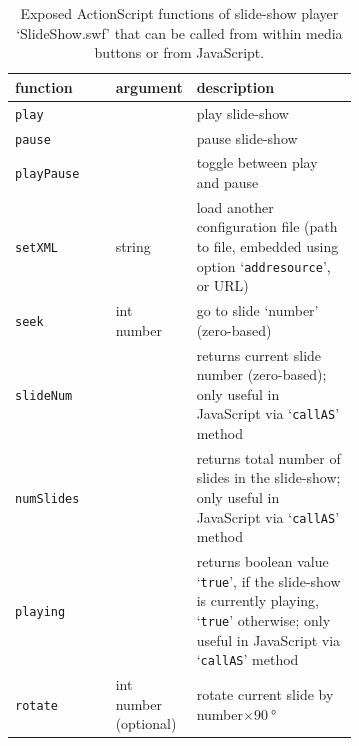 \documentclass[a4paper]{article}
\begin{document}
\begin{table}%
\centering
\caption{Exposed ActionScript functions of slide-show player `SlideShow.swf' that can be called from within media buttons or from JavaScript.}\label{SlideShowMethods}
\begin{tabular}[t]{lp{0.21\linewidth}p{0.47\linewidth}}\hline
function & argument &description\\\hline\hline
{\tt play}       &                        & play slide-show\\
{\tt pause}      &                        & pause slide-show\\
{\tt playPause}  &                        & toggle between play and pause\\
{\tt setXML}     & string                 & load another configuration file (path to file, embedded using option `{\tt addresource}', or URL)\\
{\tt seek}       & int number             & go to slide `number' (zero-based)\\
{\tt slideNum}   &                        & returns current slide number (zero-based); only useful in JavaScript via `{\tt callAS}' method\\
{\tt numSlides}  &                        & returns total number of slides in the slide-show; only useful in JavaScript via `{\tt callAS}' method\\
{\tt playing}    &                        & returns boolean value `{\tt true}', if the slide-show is currently playing, `{\tt true}' otherwise; only useful in JavaScript via `{\tt callAS}' method\\
{\tt rotate}     & int number (optional)  & rotate current slide by number$\times\SI{90}{\degree}$\\\hline
\end{tabular}
\end{table}
\end{document}
